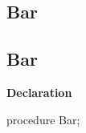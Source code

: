 \documentclass{report}
\newif\ifpdf
\begin{document}
\subsection*{\large{\textbf{Bar}}\normalsize\hspace{1ex}\hrulefill}
\else
\subsection*{Bar}
\fi
\label{ok_flag_parameter-Bar}
\begin{list}{}{
\setlength{\itemindent}{0cm}
\setlength{\listparindent}{0cm}
\setlength{\leftmargin}{\evensidemargin}
\addtolength{\leftmargin}{\tmplength}
\settowidth{\labelsep}{X}
\addtolength{\leftmargin}{\labelsep}
\setlength{\labelwidth}{\tmplength}
}
\item[\textbf{Declaration}\hfill]
\ifpdf
\begin{flushleft}
\fi
\begin{ttfamily}
procedure Bar;\end{ttfamily}

\ifpdf
\end{flushleft}
\fi

\end{list}
\end{document}
